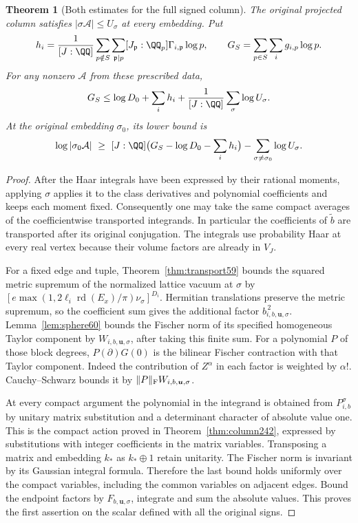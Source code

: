 \documentclass[a4paper,11pt]{article}
\newtheorem{theorem}[proposition]{Theorem}
\theoremstyle{definition}
\theoremstyle{remark}
\numberwithin{equation}{section}
\begin{document}
\begin{theorem}[Both estimates for the full signed column]\leavevmode
\label{thm:archcolumn313}
The original projected column satisfies
\(|\sigma\mathcal A|\le U_\sigma\) at every embedding. Put
\[
 h_i=\frac1{[J:\QQ]}\sum_{p\notin S}\sum_{\mathfrak p\mid p}
  [J_{\mathfrak p}:\QQ_p]\Gamma_{i,\mathfrak p}\log p,\qquad
 G_S=\sum_{p\in S}\sum_i g_{i,p}\log p .
\]
For any nonzero \(\mathcal A\) from these prescribed data,
\[
 G_S\le \log D_0+\sum_i h_i+\frac1{[J:\QQ]}\sum_\sigma\log U_\sigma .
\]
At the original embedding \(\sigma_0\), its lower bound is
\[
 \log|\sigma_0\mathcal A|\ \ge\
 [J:\QQ]\bigl(G_S-\log D_0-\sum_i h_i\bigr)
                -\sum_{\sigma\ne\sigma_0}\log U_\sigma .
\]
\end{theorem}
\begin{proof}
After the Haar integrals have been expressed by their rational
moments, applying \(\sigma\) applies it to the class derivatives
and polynomial coefficients and keeps each moment fixed.
Consequently one may take the same compact averages of the
coefficientwise transported integrands. In particular the
coefficients of \(\widetilde b\) are transported after its original
conjugation. The integrals use probability Haar at every real
vertex because their volume factors are already in \(V_J\).

For a fixed edge and tuple, Theorem~\ref{thm:transport59} bounds
the squared metric supremum of the normalized lattice vacuum
at \(\sigma\) by
\([e\max(1,2\ell_i\operatorname{rd}(E_x)/\pi)\nu_\sigma]^{D_i}\).
Hermitian translations preserve the metric supremum, so the
coefficient sum gives the additional factor
\(b_{i,b,\boldsymbol u,\sigma}^{\,2}\).
Lemma~\ref{lem:sphere60} bounds the Fischer norm of its specified
homogeneous Taylor component by \(W_{i,b,\boldsymbol u,\sigma}\),
after taking this finite sum. For a polynomial \(P\) of those
block degrees, \(P(\partial)G(0)\) is the bilinear Fischer
contraction with that Taylor component. Indeed the contribution
of \(Z^\alpha\) in each factor is weighted by \(\alpha!\).
Cauchy--Schwarz bounds it by \(\|P\|_{\rm F}W_{i,b,\boldsymbol u,\sigma}\).

At every compact argument the polynomial in the integrand is
obtained from \(P_{i,b}^\sigma\) by unitary matrix substitution
and a determinant character of absolute value one. This is the
compact action proved in Theorem~\ref{thm:column242}, expressed
by substitutions with integer coefficients in the matrix variables.
Transposing a matrix and embedding \(k_*\) as \(k_*\oplus1\)
retain unitarity. The Fischer norm is invariant by its Gaussian
integral formula. Therefore the last bound holds uniformly over
the compact variables, including the common variables on adjacent
edges. Bound the endpoint factors by \(F_{b,\boldsymbol u,\sigma}\),
integrate and sum the absolute values. This proves the first assertion
on the scalar defined with all the original signs.


\end{proof}
\end{document}
